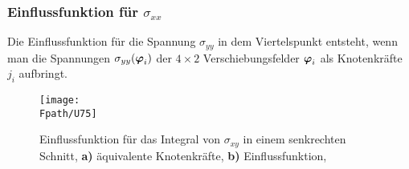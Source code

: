\begin{example}
{\textcolor{sectionTitleBlue}{\subsubsection*{Einflussfunktion f\"{u}r  $\sigma_{xx}$}}}

Die Einflussfunktion f\"{u}r die Spannung $\sigma_{yy}$ in dem Viertelspunkt entsteht, wenn man die Spannungen $\sigma_{yy}(\mbox{\boldmath $\varphi$}_i)$ der $4 \times 2$ Verschiebungsfelder $\mbox{\boldmath $\varphi$}_i$ als Knotenkr\"{a}fte $j_i$ aufbringt.
\begin{figure}[tbp]
\centering
\if {} \sidecaption \fi
\texttt{[image: \\Fpath/U75]}
\caption{Einflussfunktion f\"{u}r das Integral von $\sigma_{xy}$ in einem senkrechten Schnitt, \textbf{ a)} \"{a}quivalente Knotenkr\"{a}fte, \textbf{ b)} Einflussfunktion, \cite{Ha6}}
\label{U75}
%
\end{figure}%


\end{example}
